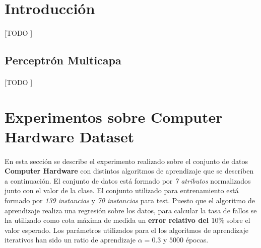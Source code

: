 \documentclass{article}
\begin{document}
	\maketitle %

	\thispagestyle{fancy} %



	\begin{abstract}
		\noindent [TODO ]
	\end{abstract}



	\section{Introducción}
	\label{sec:introducción}

		\paragraph{}
		[TODO ]

		\subsection{Perceptrón Multicapa}
		\label{sec:multilayer-perceptron}

			\paragraph{}
			[TODO ]

	\section{Experimentos sobre Computer Hardware Dataset}
	\label{sec:e1}

		\paragraph{}
		En esta sección se describe el experimento realizado sobre el conjunto de datos \textbf{Computer Hardware} \cite{dataset:computer_hardware} con distintos algoritmos de aprendizaje que se describen a continuación. El conjunto de datos está formado por \emph{7 atributos} normalizados junto con el valor de la clase. El conjunto utilizado para entrenamiento está formado por \emph{139 instancias} y \emph{70 instancias} para test. Puesto que el algoritmo de aprendizaje realiza una regresión sobre los datos, para calcular la tasa de fallos se ha utilizado como cota máxima de medida un \textbf{error relativo del $10\%$} sobre el valor esperado. Los parámetros utilizados para el los algoritmos de aprendizaje iterativos han sido un ratio de aprendizaje $\alpha = 0.3$ y $5000$ épocas.
\end{document}
